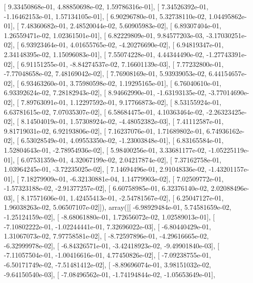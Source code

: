\documentclass{article}
\begin{document}
       [  9.33450868e-01,   4.88850698e-02,   1.59786316e-01],
       [  7.34526392e-01,  -1.16462153e-01,   1.57134105e-01],
       [  6.90296780e-01,   5.32738110e-02,   1.04495862e-01],
       [  7.48360682e-01,   2.48520044e-02,   5.60905983e-02],
       [  6.89307404e-01,   1.26559471e-02,   1.02361501e-01],
       [  6.82229809e-01,   9.84577203e-03,  -3.17030251e-02],
       [  6.93923464e-01,   4.01655765e-02,  -4.20276690e-02],
       [  6.94819347e-01,   2.34148395e-02,   1.15096083e-01],
       [  7.55074228e-01,   4.44344490e-02,  -1.27743391e-02],
       [  6.91151255e-01,  -8.84274537e-02,   7.16601139e-03],
       [  7.77232800e-01,  -7.77048658e-02,   7.48169042e-02],
       [  7.76908169e-01,   5.93939053e-02,   6.44154657e-02],
       [  6.93463260e-01,   3.75980598e-02,   1.19295165e-01],
       [  6.76040610e-01,   6.93392624e-02,   7.28182943e-02],
       [  8.94662990e-01,  -1.63193135e-02,  -3.77014690e-02],
       [  7.89763091e-01,   1.12297592e-01,   9.17766873e-02],
       [  8.53155924e-01,   6.63781615e-02,   7.07035307e-02],
       [  6.58684475e-01,   4.10363464e-02,  -2.26323425e-02],
       [  8.14504019e-01,   1.57308924e-02,  -4.48052382e-03],
       [  7.41112587e-01,   9.81719031e-02,   6.92193806e-02],
       [  7.16237076e-01,   1.71689802e-01,   6.74936162e-02],
       [  6.53028549e-01,   4.09553350e-02,  -1.23003848e-01],
       [  6.83165584e-01,   1.52804643e-01,  -2.78954936e-02],
       [  5.98400256e-01,   3.33681177e-02,  -1.05225119e-01],
       [  6.07531359e-01,   4.32067199e-02,   2.04217874e-02],
       [  7.37162758e-01,   1.03964245e-01,  -3.72235025e-02],
       [  7.14694496e-01,   2.91048336e-02,  -1.43201157e-01],
       [  7.18279909e-01,  -6.32130881e-04,   1.14779903e-02],
       [  7.02509772e-01,  -1.57323188e-02,  -2.91377257e-02],
       [  6.60758985e-01,   6.32376140e-02,   2.02088496e-03],
       [  8.17571606e-01,   1.42455413e-01,  -2.54781567e-02],
       [  6.25047127e-01,   1.96038263e-02,   5.06507107e-02]]), array([[ -6.98929484e-01,   5.74581659e-02,  -1.25124159e-02],
       [ -8.68061880e-01,   1.72656072e-02,   1.02589013e-01],
       [ -7.10802222e-01,  -1.02244441e-01,   7.32696022e-03],
       [ -6.80440429e-01,   1.31067073e-02,   7.97758581e-02],
       [ -8.72597896e-01,  -4.29616665e-02,  -6.32999978e-02],
       [ -6.84326571e-01,  -3.42418923e-02,  -9.49901840e-03],
       [ -7.11057504e-01,  -1.00416616e-01,   4.77450826e-02],
       [ -7.09238755e-01,  -6.50171749e-02,  -7.51481412e-02],
       [ -8.89696074e-01,   3.98151032e-02,  -9.64150540e-03],
       [ -7.08496562e-01,  -1.74194844e-02,  -1.05653649e-01],
\end{document}
